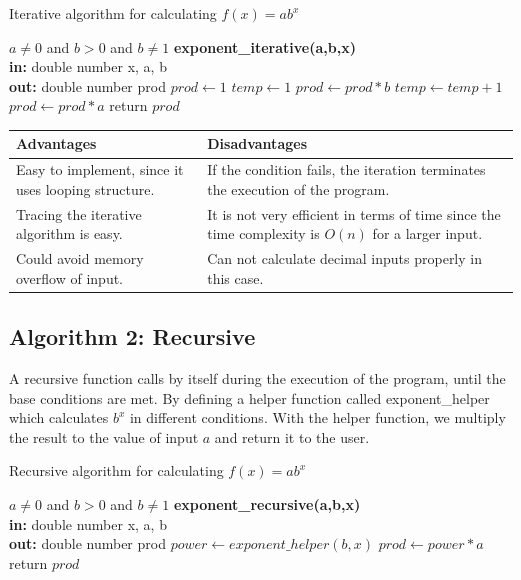 \documentclass[11pt]{article}
\begin{document}
\begin{algorithm}
  \caption{Iterative algorithm for calculating $f(x) = ab^x$}
  \begin{algorithmic}[1]
  \Require $a \neq 0$ and $b > 0$ and $b \neq 1$ 
    \Function\textbf{\textbf{exponent\_iterative(a,b,x)}}\\
    \textbf{in: }double number x, a, b\\
    \textbf{out: }double number prod
    \State $prod \gets 1$
    \State $temp \gets 1$
        \qquad \State $prod \leftarrow prod*b$
        \qquad \State $temp \leftarrow temp+1$
    \EndFor
    \State $prod \gets prod*a$
    \State return $prod$
    \EndFunction
  \end{algorithmic}
\end{algorithm}

\begin{center}
\begin{tabular}{|p{7cm}|p{7cm}|}
\hline
     \textbf{Advantages} & \textbf{Disadvantages}\\ \hline
     Easy to implement, since it uses looping structure. & If the condition fails, the iteration terminates the execution of the program.\\ \hline
     Tracing the iterative algorithm is easy. & It is not very efficient in terms of time since the time complexity is $O(n)$ for a larger input\cite{xu2015application}. \\ \hline
     Could avoid memory overflow of input. & Can not calculate decimal inputs properly in this case.\\ \hline
\end{tabular}
\end{center}

\subsection{Algorithm 2: Recursive}
A recursive function calls by itself during the execution of the program, until the base conditions are met\cite{haberman2002case}. By defining a helper function called exponent\_helper which calculates $b^x$ in different conditions. With the helper function, we multiply the result to the value of input $a$ and return it to the user.

\begin{algorithm}
  \caption{Recursive algorithm for calculating $f(x) = ab^x$}
  \begin{algorithmic}[1]
  \Require $a \neq 0$ and $b > 0$ and $b \neq 1$ 
   \Function\textbf{\textbf{exponent\_recursive(a,b,x)}}\\
    \textbf{in: }double number x, a, b\\
    \textbf{out: }double number prod
    \State $power \gets exponent\_helper(b,x)$
    \State $prod \gets power * a$
    \State return $prod$
    \EndFunction
  \end{algorithmic}
\end{algorithm}
\end{document}
